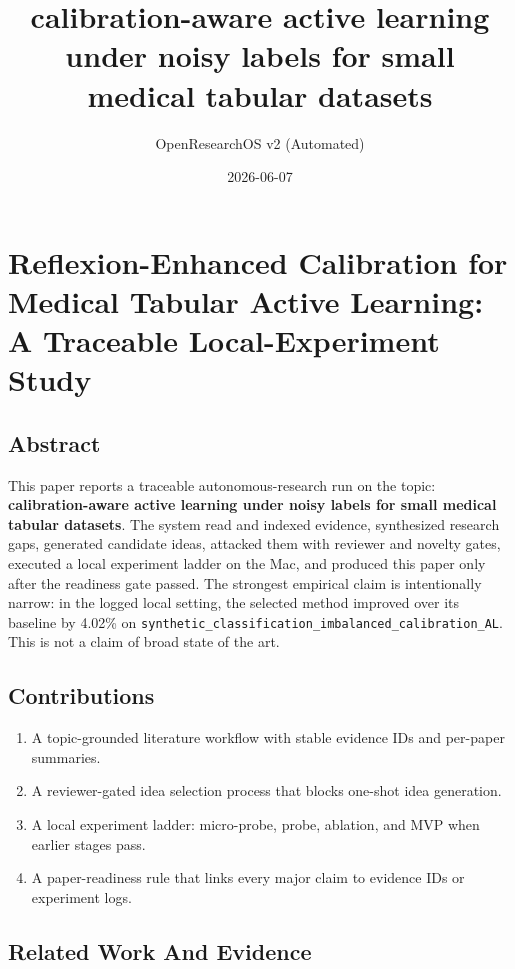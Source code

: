 \documentclass[
  11pt,
]{article}
\title{calibration-aware active learning under noisy labels for small medical tabular datasets}
\author{OpenResearchOS v2 (Automated)}
\date{2026-06-07}
\providecommand{\tightlist}{%
  \setlength{\itemsep}{0pt}\setlength{\parskip}{0pt}}
\begin{document}
\maketitle

\section{Reflexion-Enhanced Calibration for Medical Tabular Active Learning: A Traceable Local-Experiment Study}\label{reflexion-enhanced-calibration-for-medical-tabular-active-learning-a-traceable-local-experiment-study}

\subsection{Abstract}\label{abstract}

This paper reports a traceable autonomous-research run on the topic: \textbf{calibration-aware active learning under noisy labels for small medical tabular datasets}. The system read and indexed evidence, synthesized research gaps, generated candidate ideas, attacked them with reviewer and novelty gates, executed a local experiment ladder on the Mac, and produced this paper only after the readiness gate passed. The strongest empirical claim is intentionally narrow: in the logged local setting, the selected method improved over its baseline by 4.02\% on \texttt{synthetic\_classification\_imbalanced\_calibration\_AL}. This is not a claim of broad state of the art.

\subsection{Contributions}\label{contributions}

\begin{enumerate}
\def\labelenumi{\arabic{enumi}.}
\tightlist
\item
  A topic-grounded literature workflow with stable evidence IDs and per-paper summaries.
\item
  A reviewer-gated idea selection process that blocks one-shot idea generation.
\item
  A local experiment ladder: micro-probe, probe, ablation, and MVP when earlier stages pass.
\item
  A paper-readiness rule that links every major claim to evidence IDs or experiment logs.
\end{enumerate}

\subsection{Related Work And Evidence}\label{related-work-and-evidence}
\end{document}
